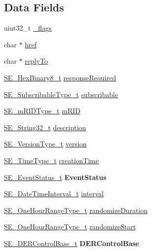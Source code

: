 \subsection*{Data Fields}
\begin{DoxyCompactItemize}
\item 
uint32\+\_\+t \hyperlink{group__DERControl_ga52dda811cfca73e6781ad02d31086a65}{\+\_\+flags}
\item 
char $\ast$ \hyperlink{group__DERControl_ga8a2640fa1741cf7ff9d7cbc61a4e5a98}{href}
\item 
char $\ast$ \hyperlink{group__DERControl_ga806b4c2bc9bcd1bc266ade8162433189}{reply\+To}
\item 
\hyperlink{group__HexBinary8_gaecf2dab3615fb954a693c017a61f77d6}{S\+E\+\_\+\+Hex\+Binary8\+\_\+t} \hyperlink{group__DERControl_gaf2999637e9a94c1c27d0db7a93e44f2c}{response\+Required}
\item 
\hyperlink{group__SubscribableType_ga5c41f553d369710ed34619266bf2551e}{S\+E\+\_\+\+Subscribable\+Type\+\_\+t} \hyperlink{group__DERControl_ga5ad57e29338dc1d42895e53cbf04262b}{subscribable}
\item 
\hyperlink{group__mRIDType_gac74622112f3a388a2851b2289963ba5e}{S\+E\+\_\+m\+R\+I\+D\+Type\+\_\+t} \hyperlink{group__DERControl_ga0ea191ea24dce47c5860cab985a327ec}{m\+R\+ID}
\item 
\hyperlink{group__String32_gac9f59b06b168b4d2e0d45ed41699af42}{S\+E\+\_\+\+String32\+\_\+t} \hyperlink{group__DERControl_ga5526265cc4f511484ec5ee50458a33ce}{description}
\item 
\hyperlink{group__VersionType_ga4b8d27838226948397ed99f67d46e2ae}{S\+E\+\_\+\+Version\+Type\+\_\+t} \hyperlink{group__DERControl_gaa5a815f8a9d72a61d295548d8ef878d5}{version}
\item 
\hyperlink{group__TimeType_ga6fba87a5b57829b4ff3f0e7638156682}{S\+E\+\_\+\+Time\+Type\+\_\+t} \hyperlink{group__DERControl_ga9d5738589e0b4a269f3f845eb6f5f730}{creation\+Time}
\item 
\hyperlink{structSE__EventStatus__t}{S\+E\+\_\+\+Event\+Status\+\_\+t} {\bfseries Event\+Status}
\item 
\hyperlink{structSE__DateTimeInterval__t}{S\+E\+\_\+\+Date\+Time\+Interval\+\_\+t} \hyperlink{group__DERControl_ga3608bd0d2649c03622fa27b33c5f9f8a}{interval}
\item 
\hyperlink{group__OneHourRangeType_ga2b9c57435b20a5fc0689922b77e97c2d}{S\+E\+\_\+\+One\+Hour\+Range\+Type\+\_\+t} \hyperlink{group__DERControl_ga2c4d801840699ca2af4d15228ec2b92a}{randomize\+Duration}
\item 
\hyperlink{group__OneHourRangeType_ga2b9c57435b20a5fc0689922b77e97c2d}{S\+E\+\_\+\+One\+Hour\+Range\+Type\+\_\+t} \hyperlink{group__DERControl_ga0570665f45427d3bea85bb34ba79d77e}{randomize\+Start}
\item 
\hyperlink{structSE__DERControlBase__t}{S\+E\+\_\+\+D\+E\+R\+Control\+Base\+\_\+t} {\bfseries D\+E\+R\+Control\+Base}
\end{DoxyCompactItemize}


